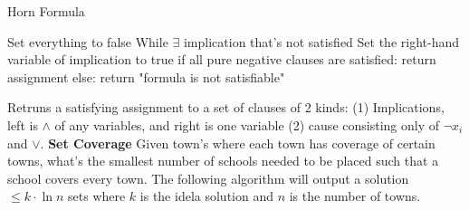 \documentclass{article}
\begin{document}
\begin{multicols}{2}
\begin{algorithm}[H]
\label{alg:quad}
\caption{Horn Formula}\label{euclid}
\begin{algorithmic}[1]
\State Set everything to false
\State While $\exists$ implication that's not satisfied
\Indent
\State Set the right-hand variable of implication to true
\EndIndent
\State if all pure negative clauses are satisfied: return assignment 
\State else: return "formula is not satisfiable"
\end{algorithmic}
\end{algorithm}
\setlength{\floatsep}{0.0cm}
Retruns a satisfying assignment to a set of clauses of 2 kinds: (1) Implications, left is $\wedge$ of any variables, and right is one variable (2) cause consisting only of $\neg x_i$ and $\vee$. \newline
\textbf{Set Coverage} \newline 
Given town's where each town has coverage of certain towns, what's the smallest number of schools needed to be placed such that a school covers every town. The following algorithm will output a solution $\leq k \cdot \ln n$ sets where $k$ is the idela solution and $n$ is the number of towns. 


\end{multicols}
\end{document}

